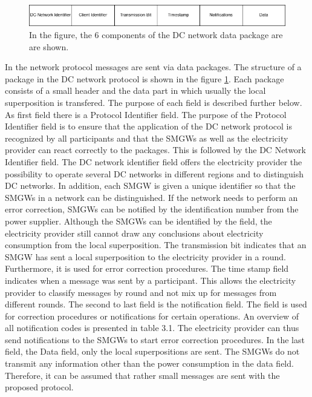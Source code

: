 \\\begin{figure}[tbp]
  \centering
  \includegraphics[width=1\textwidth]{images/Header.png}
  \caption[DC Network Frame]{
In the figure, the 6 components of the DC network data package are
are shown.}
  \label{fig:frame}
\end{figure}In the network protocol messages are sent via data packages. The structure of a package in the DC network protocol is shown in the figure \ref{fig:frame}. Each package consists of a small header and the data part in which usually the local superposition is transfered. The purpose of each field is described further below.\\
As first field there is a Protocol Identifier field. The purpose of the Protocol Identifier field is to ensure that the application of the DC network protocol is recognized by all participants and that the SMGWs as well as the electricity provider can react correctly to the packages. This is followed by the DC Network Identifier field.%
The DC network identifier field offers the electricity provider the possibility to operate several DC networks in different regions and to distinguish DC networks. In addition, each SMGW is given a unique identifier so that the SMGWs in a network can be distinguished. If the network needs to perform an error correction, SMGWs can be notified by the identification number from the power supplier. Although the SMGWs can be identified by the field, the electricity provider still cannot draw any conclusions about electricity consumption from the local superposition. The transmission bit indicates that an SMGW has sent a local superposition to the electricity provider in a round. Furthermore, it is used for error correction procedures. The time stamp field indicates when a message was sent by a participant. This allows the electricity provider to classify messages by round and not mix up for messages from different rounds. The second to last field is the notification field. The field is used for correction procedures or notifications for certain operations. An overview of all notification codes is presented in table 3.1. The electricity provider can thus send notifications to the SMGWs to start error correction procedures. In the last field, the Data field, only the local superpositions are sent. The SMGWs do not transmit any information other than the power consumption in the data field. Therefore, it can be assumed that rather small messages are sent with the proposed protocol.\\
